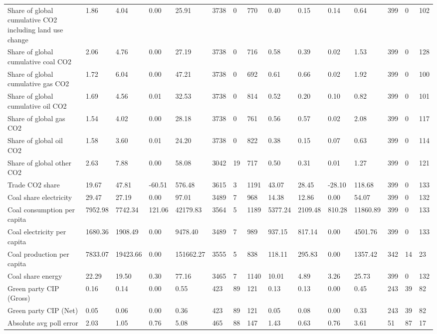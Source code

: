 \begin{longtable}{lllllllllllllll}
Share of global cumulative CO2 including land use change & 1.86 & 4.04 & 0.00 & 25.91 & 3738 & 0 & 770 & 0.40 & 0.15 & 0.14 & 0.64 & 399 & 0 & 102\\
Share of global cumulative coal CO2 & 2.06 & 4.76 & 0.00 & 27.19 & 3738 & 0 & 716 & 0.58 & 0.39 & 0.02 & 1.53 & 399 & 0 & 128\\
Share of global cumulative gas CO2 & 1.72 & 6.04 & 0.00 & 47.21 & 3738 & 0 & 692 & 0.61 & 0.66 & 0.02 & 1.92 & 399 & 0 & 100\\
\addlinespace
Share of global cumulative oil CO2 & 1.69 & 4.56 & 0.01 & 32.53 & 3738 & 0 & 814 & 0.52 & 0.20 & 0.10 & 0.82 & 399 & 0 & 101\\
Share of global gas CO2 & 1.54 & 4.02 & 0.00 & 28.18 & 3738 & 0 & 761 & 0.56 & 0.57 & 0.02 & 2.08 & 399 & 0 & 117\\
Share of global oil CO2 & 1.58 & 3.60 & 0.01 & 24.20 & 3738 & 0 & 822 & 0.38 & 0.15 & 0.07 & 0.63 & 399 & 0 & 114\\
Share of global other CO2 & 2.63 & 7.88 & 0.00 & 58.08 & 3042 & 19 & 717 & 0.50 & 0.31 & 0.01 & 1.27 & 399 & 0 & 121\\
Trade CO2 share & 19.67 & 47.81 & -60.51 & 576.48 & 3615 & 3 & 1191 & 43.07 & 28.45 & -28.10 & 118.68 & 399 & 0 & 133\\
\addlinespace
Coal share electricity & 29.47 & 27.19 & 0.00 & 97.01 & 3489 & 7 & 968 & 14.38 & 12.86 & 0.00 & 54.07 & 399 & 0 & 132\\
Coal consumption per capita & 7952.98 & 7742.34 & 121.06 & 42179.83 & 3564 & 5 & 1189 & 5377.24 & 2109.48 & 810.28 & 11860.89 & 399 & 0 & 133\\
Coal electricity per capita & 1680.36 & 1908.49 & 0.00 & 9478.40 & 3489 & 7 & 989 & 937.15 & 817.14 & 0.00 & 4501.76 & 399 & 0 & 133\\
Coal production per capita & 7833.07 & 19423.66 & 0.00 & 151662.27 & 3555 & 5 & 838 & 118.11 & 295.83 & 0.00 & 1357.42 & 342 & 14 & 23\\
Coal share energy & 22.29 & 19.50 & 0.30 & 77.16 & 3465 & 7 & 1140 & 10.01 & 4.89 & 3.26 & 25.73 & 399 & 0 & 132\\
\addlinespace
Green party CIP (Gross) & 0.16 & 0.14 & 0.00 & 0.55 & 423 & 89 & 121 & 0.13 & 0.13 & 0.00 & 0.45 & 243 & 39 & 82\\
Green party CIP (Net) & 0.05 & 0.06 & 0.00 & 0.36 & 423 & 89 & 121 & 0.05 & 0.08 & 0.00 & 0.33 & 243 & 39 & 82\\
Absolute avg poll error & 2.03 & 1.05 & 0.76 & 5.08 & 465 & 88 & 147 & 1.43 & 0.63 & 0.76 & 3.61 & 51 & 87 & 17\\

\end{longtable}
